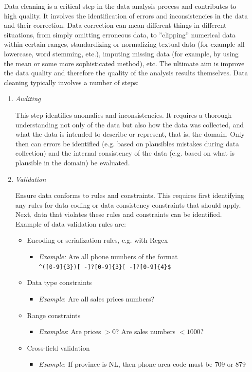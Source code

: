 Data cleaning is a critical step in the data analysis process and contributes to high quality. It involves the identification of errors and inconsistencies in the data and their correction. Data correction can mean different things in different situations, from simply omitting erroneous data, to ''clipping'' numerical data within certain ranges, standardizing or normalizing textual data (for example all lowercase, word stemming, etc.), imputing missing data (for example, by using the mean or some more sophisticated method), etc. The ultimate aim is improve the data quality and therefore the quality of the analysis results themselves. Data cleaning typically involves a number of steps:

\begin{enumerate}
\item \emph{Auditing}

This step identifies anomalies and inconsistencies. It requires a thorough understanding not only of the data but also how the data was collected, and what the data is intended to describe or represent, that is, the domain. Only then can errors be identified (e.g. based on plausibles mistakes during data collection) and the internal consistency of the data (e.g. based on what is plausible in the domain) be evaluated. 

\item \emph{Validation}

Ensure data conforms to rules and constraints. This requires first identifying any rules for data coding or data consistency constraints that should apply. Next, data that violates these rules and constraints can be identified. Example of data validation rules are:

\begin{itemize}
 \item Encoding or serialization rules, e.g. with Regex 
 \begin{itemize}
   \item \emph{Example:} Are all phone numbers of the format\\
   \colorbox{code}{\texttt{\footnotesize \Verb_^([0-9]{3})[ -]?[0-9]{3}[ -]?[0-9]{4}$_}}
 \end{itemize}
 \item Data type constraints
 \begin{itemize}
   \item \emph{Example}: Are all sales prices numbers?
 \end{itemize}
 \item Range constraints
 \begin{itemize}
   \item \emph{Examples}: Are prices $> 0$? Are sales numbers $< 1000$?
 \end{itemize}
 \item Cross-field validation
 \begin{itemize}
   \item \emph{Example}: If province is NL, then phone area code must be 709 or 879
 \end{itemize}
\end{itemize}


\end{enumerate}
